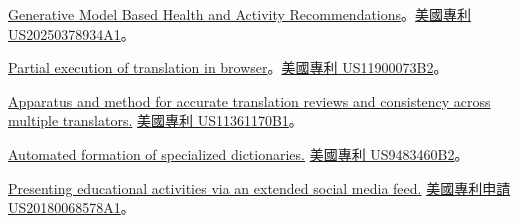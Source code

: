
\href{https://patents.google.com/patent/US20250378934A1}{Generative Model Based Health and Activity Recommendations}。\hypersetup{urlcolor=black}\href{https://patents.google.com/patent/US20250378934A1}{美國專利 US20250378934A1}\hypersetup{urlcolor=linkcol}。 %

\href{https://patents.google.com/patent/US11900073B2}{Partial execution of translation in browser}。\hypersetup{urlcolor=black}\href{https://patents.google.com/patent/US11900073B2}{美國專利 US11900073B2}\hypersetup{urlcolor=linkcol}。 %

{\small \href{https://patents.google.com/patent/US11361170B1}{Apparatus and method for accurate translation reviews and consistency across multiple translators.} \hypersetup{urlcolor=black}\href{https://patents.google.com/patent/US11361170B1}{美國專利 US11361170B1}\hypersetup{urlcolor=linkcol}。} %

\href{https://patents.google.com/patent/US9483460B2}{Automated formation of specialized dictionaries.} \hypersetup{urlcolor=black}\href{https://patents.google.com/patent/US9483460B2}{美國專利 US9483460B2}\hypersetup{urlcolor=linkcol}。 %

\href{https://patents.google.com/patent/US20180068578A1}{Presenting educational activities via an extended social media feed.} \hypersetup{urlcolor=black}\href{https://patents.google.com/patent/US20180068578A1}{美國專利申請 US20180068578A1}\hypersetup{urlcolor=linkcol}。